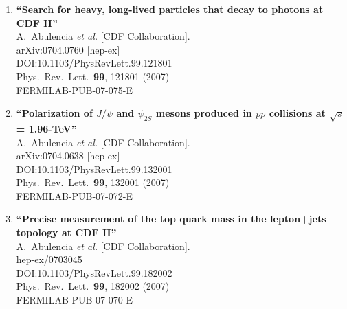 \documentclass{article}
\begin{document}
\begin{enumerate}
{\bf ``Measurement of the top-quark mass using missing $E_T$ + jets events with secondary vertex $b-$tagging at CDF II''}
  \\{}T.~Aaltonen {\it et al.} [CDF Collaboration].
  \\{}arXiv:0705.1594 [hep-ex]
  \\{}DOI:10.1103/PhysRevD.75.111103
  \\{}Phys.\ Rev.\ D {\bf 75}, 111103 (2007)
  \\{}FERMILAB-PUB-07-191-E
\item%
{\bf ``Search for heavy, long-lived particles that decay to photons at CDF II''}
  \\{}A.~Abulencia {\it et al.} [CDF Collaboration].
  \\{}arXiv:0704.0760 [hep-ex]
  \\{}DOI:10.1103/PhysRevLett.99.121801
  \\{}Phys.\ Rev.\ Lett.\  {\bf 99}, 121801 (2007)
  \\{}FERMILAB-PUB-07-075-E
\item%
{\bf ``Polarization of $J/\psi$ and $\psi_{2S}$ mesons produced in $p \bar{p}$ collisions at $\sqrt{s}$ = 1.96-TeV''}
  \\{}A.~Abulencia {\it et al.} [CDF Collaboration].
  \\{}arXiv:0704.0638 [hep-ex]
  \\{}DOI:10.1103/PhysRevLett.99.132001
  \\{}Phys.\ Rev.\ Lett.\  {\bf 99}, 132001 (2007)
  \\{}FERMILAB-PUB-07-072-E
\item%
{\bf ``Precise measurement of the top quark mass in the lepton+jets topology at CDF II''}
  \\{}A.~Abulencia {\it et al.} [CDF Collaboration].
  \\{}hep-ex/0703045
  \\{}DOI:10.1103/PhysRevLett.99.182002
  \\{}Phys.\ Rev.\ Lett.\  {\bf 99}, 182002 (2007)
  \\{}FERMILAB-PUB-07-070-E

\end{enumerate}
\end{document}
